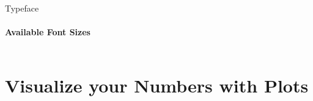 \documentclass[aspectratio=169]{beamer}
\begin{document}
\begin{frame}{Typeface}
    \framesubtitle{Available Font Sizes}
    \vfill
    \begin{columns}
        \centering
        \thefontsize[TINY]\TINY
        \thefontsize[Tiny]\Tiny
        \thefontsize[myFootnotesize]\myFootnotesize
        \thefontsize[tiny]\tiny
        \thefontsize[scriptsize]\scriptsize
        \thefontsize[footnotesize]\footnotesize
        \thefontsize[small]\small
        \thefontsize[normalsize]\normalsize
        \thefontsize[large]\large
    
        \centering
        \thefontsize[Large]\Large
        \thefontsize[LARGE]\LARGE
        \thefontsize[huge]\huge
        \thefontsize[Huge]\Huge
    \end{columns}
    \vfill
\end{frame}

\section{Visualize your Numbers with \textbf{Plots}}

\begin{frame}
\end{frame}
\end{document}
